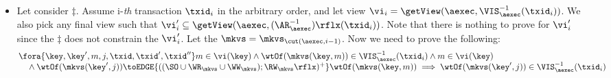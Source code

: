 \begin{itemize}
\item Let consider \( \ddagger \).
Assume i-\emph{th} transaction \( \txid_i \) in the arbitrary order,
and let view \( \vi_{i} = \getView(\aexec, \VIS^{-1}_{\aexec}(\txid_{i}) ) \).
We also pick any final view such that \( \vi'_{i} \subseteq \getView(\aexec, (\AR^{-1}_{\aexec})\rflx(\txid_{i}) ) \).
Note that there is nothing to prove for \( \vi'_i \) since the \( \ddagger \) does not constrain the \( \vi'_i \).
Let the \( \mkvs = \mkvs_{\cut(\aexec, i-1)} \).
Now we need to prove the following:
\begin{gather}
    \label{equ:si-complete-arvis}
    \begin{array}{@{}l@{}}
        \fora{\key, \key', m, j, \txid, \txid', \txid''} 
        m \in \vi(\key) 
        \land \wtOf(\mkvs(\key,m)) \in \VIS^{-1}_{\aexec}(\txid_{i})
        \land m \in \vi(\key)  \\
        \quad {} \wedge \wtOf(\mkvs(\key', j)) \toEDGE{((\SO \cup \WR_{\mkvs} \cup \WW_{\mkvs}) ; \RW_{\mkvs}\rflx)^{+}} \wtOf(\mkvs(\key, m)) 
        \implies \wtOf(\mkvs(\key',j)) \in \VIS^{-1}_{\aexec}(\txid_{i})
    \end{array} 
\end{gather}

\end{itemize}
